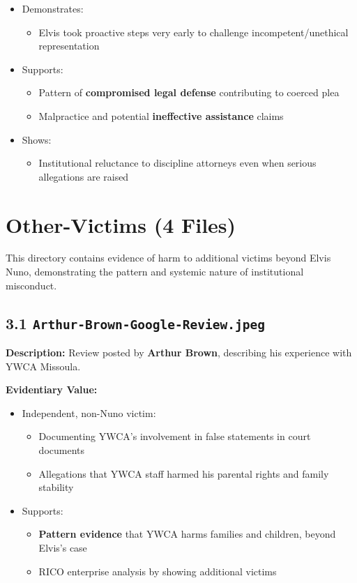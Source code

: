 \documentclass[11pt, letterpaper]{article}
\begin{document}
\begin{itemize}[leftmargin=*]
  \item Demonstrates:
    \begin{itemize}
      \item Elvis took proactive steps very early to challenge incompetent/unethical representation
    \end{itemize}
  \item Supports:
    \begin{itemize}
      \item Pattern of \textbf{compromised legal defense} contributing to coerced plea
      \item Malpractice and potential \textbf{ineffective assistance} claims
    \end{itemize}
  \item Shows:
    \begin{itemize}
      \item Institutional reluctance to discipline attorneys even when serious allegations are raised
    \end{itemize}
\end{itemize}

\newpage

\section{Other-Victims (4 Files)}

This directory contains evidence of harm to additional victims beyond Elvis Nuno, demonstrating the pattern and systemic nature of institutional misconduct.

\subsection{3.1 \texttt{Arthur-Brown-Google-Review.jpeg}}

\textbf{Description:} Review posted by \textbf{Arthur Brown}, describing his experience with YWCA Missoula.

\textbf{Evidentiary Value:}

\begin{itemize}[leftmargin=*]
  \item Independent, non-Nuno victim:
    \begin{itemize}
      \item Documenting YWCA's involvement in false statements in court documents
      \item Allegations that YWCA staff harmed his parental rights and family stability
    \end{itemize}
  \item Supports:
    \begin{itemize}
      \item \textbf{Pattern evidence} that YWCA harms families and children, beyond Elvis's case
      \item RICO enterprise analysis by showing additional victims
    \end{itemize}
\end{itemize}
\end{document}
